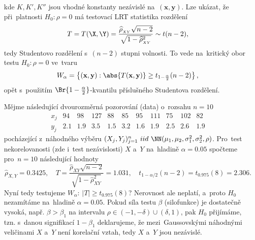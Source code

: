 kde $K,K',K''$ jsou vhodné konstanty nezávislé na~$(\textbf{x},\textbf{y})$. Lze ukázat, že při~platnosti $H_0:\rho=0$ má testovací LRT statistika rozdělení $$T=T(\X,\Y)=\frac{\widehat{\rho}_{_{XY}}\sqrt{n-2}}{\sqrt{1-\widehat{\rho}_{_{XY}}^2}}\sim t(n-2),$$ tedy Studentovo rozdělení s~$(n-2)$ stupni volnosti. To vede na~kritický obor testu $H_0:\rho=0$ ve~tvaru $$ W_\alpha=\left\{ (\textbf{x},\textbf{y}):\abs{T(\textbf{x},\textbf{y})}\geq t_{1-\frac{\alpha}{2}}(n-2) \right\}, $$ opět s~použitím $\Br{1-\frac{\alpha}{2}}$-kvantilu příslušného Studentova rozdělení.
\begin{example} Mějme následující dvourozměrná pozorování (data) o~rozsahu $n=10$
	$$	\begin{array}{c|cccccccccc}
	x_j & 94 & 98 & 127 & 88 & 85 & 95 & 111 & 75 & 102 & 82 \\ \hline
	y_j & 2.1 & 1.9 & 3.5 & 1.5 & 3.2 & 1.6 & 1.9 & 2.5 & 2.6 & 1.9
	\end{array} $$ pocházející z~náhodného výběru $(X_j,Y_j)_{j=1}^n~iid~\NN(\mu_1,\mu_2,\sigma_1^2,\sigma_2^2,\rho)$. Pro~test nekorelovanosti (zde i~test nezávislosti) $X$ a~$Y$ na~hladině $\alpha=0.05$ spočteme pro~$n=10$ následující hodnoty $$
	\widehat{\rho}_{X,Y}=0.3425,\quad T=\frac{\widehat{\rho}_{XY}\sqrt{n-2}}{\sqrt{1-\widehat{\rho}_{XY}^2}}=1.031,\quad
	t_{1-\alpha/2}(n-2)=t_{0.975}(8)=2.306.$$
	Nyní tedy testujeme $W_\alpha:~|T|\geq t_{0.975}(8)$? Nerovnost ale neplatí, a~proto $H_0$ nezamítáme na~hladině $\alpha=0.05$.
	Pokud síla testu $\beta$ (silofunkce) je dostatečně vysoká, např. $\beta>\beta_1$ na intervalu $\rho\in(-1,-\delta)\cup(\delta,1)$, pak $H_0$ přijímáme, tzn. s~danou signifikací $1-\beta_1$ deklarujeme, že mezi~Gaussovskými náhodnými veličinami $X$ a~$Y$ není korelační vztah, tedy $X$ a~$Y$ jsou nezávislé.
\end{example}
